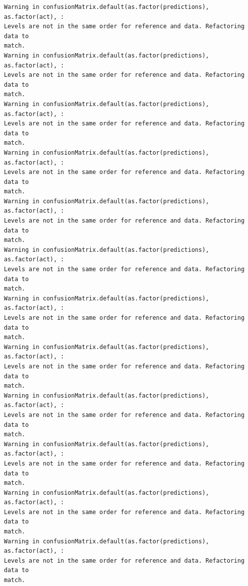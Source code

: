 \documentclass[
  letterpaper,
  DIV=11,
  numbers=noendperiod]{scrartcl}
\newenvironment{Shaded}{\begin{snugshade}}{\end{snugshade}}
\newcommand{\AttributeTok}[1]{\textcolor[rgb]{0.40,0.45,0.13}{#1}}
\newcommand{\CommentTok}[1]{\textcolor[rgb]{0.37,0.37,0.37}{#1}}
\newcommand{\DocumentationTok}[1]{\textcolor[rgb]{0.37,0.37,0.37}{\textit{#1}}}
\newcommand{\FunctionTok}[1]{\textcolor[rgb]{0.28,0.35,0.67}{#1}}
\newcommand{\NormalTok}[1]{\textcolor[rgb]{0.00,0.23,0.31}{#1}}
\newcommand{\OtherTok}[1]{\textcolor[rgb]{0.00,0.23,0.31}{#1}}
\newcommand{\SpecialCharTok}[1]{\textcolor[rgb]{0.37,0.37,0.37}{#1}}
\newcommand{\StringTok}[1]{\textcolor[rgb]{0.13,0.47,0.30}{#1}}
\begin{document}
\begin{Shaded}
\end{Shaded}

\begin{verbatim}
Warning in confusionMatrix.default(as.factor(predictions), as.factor(act), :
Levels are not in the same order for reference and data. Refactoring data to
match.
Warning in confusionMatrix.default(as.factor(predictions), as.factor(act), :
Levels are not in the same order for reference and data. Refactoring data to
match.
Warning in confusionMatrix.default(as.factor(predictions), as.factor(act), :
Levels are not in the same order for reference and data. Refactoring data to
match.
Warning in confusionMatrix.default(as.factor(predictions), as.factor(act), :
Levels are not in the same order for reference and data. Refactoring data to
match.
Warning in confusionMatrix.default(as.factor(predictions), as.factor(act), :
Levels are not in the same order for reference and data. Refactoring data to
match.
Warning in confusionMatrix.default(as.factor(predictions), as.factor(act), :
Levels are not in the same order for reference and data. Refactoring data to
match.
Warning in confusionMatrix.default(as.factor(predictions), as.factor(act), :
Levels are not in the same order for reference and data. Refactoring data to
match.
Warning in confusionMatrix.default(as.factor(predictions), as.factor(act), :
Levels are not in the same order for reference and data. Refactoring data to
match.
Warning in confusionMatrix.default(as.factor(predictions), as.factor(act), :
Levels are not in the same order for reference and data. Refactoring data to
match.
Warning in confusionMatrix.default(as.factor(predictions), as.factor(act), :
Levels are not in the same order for reference and data. Refactoring data to
match.
Warning in confusionMatrix.default(as.factor(predictions), as.factor(act), :
Levels are not in the same order for reference and data. Refactoring data to
match.
Warning in confusionMatrix.default(as.factor(predictions), as.factor(act), :
Levels are not in the same order for reference and data. Refactoring data to
match.
\end{verbatim}
\end{document}
